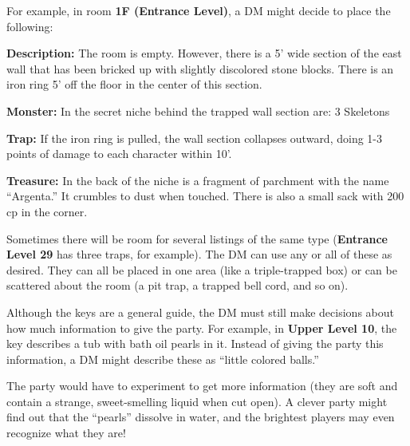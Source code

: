 \documentclass[palace_of_the_silver_princess]{subfiles}
\begin{document}
For example, in room \textbf{1F (Entrance Level)}, a DM might decide to
place the following:

\textbf{Description:} The room is empty. However, there is a 5’ wide
section of the east wall that has been bricked up with slightly
discolored stone blocks. There is an iron ring 5’ off the floor in the
center of this section.

\textbf{Monster:} In the secret niche behind the trapped wall section
are: 3 Skeletons

\textbf{Trap:} If the iron ring is pulled, the wall section collapses
outward, doing 1-3 points of damage to each character within 10’.

\textbf{Treasure:} In the back of the niche is a fragment of parchment
with the name “Argenta.” It crumbles to dust when touched. There is also
a small sack with 200 cp in the corner.

Sometimes there will be room for several listings of the same type
(\textbf{Entrance Level 29} has three traps, for example). The DM can
use any or all of these as desired. They can all be placed in one area
(like a triple-trapped box) or can be scattered about the room (a pit
trap, a trapped bell cord, and so on).

Although the keys are a general guide, the DM must still make decisions
about how much information to give the party. For example, in
\textbf{Upper Level 10}, the key describes a tub with bath oil pearls in
it. Instead of giving the party this information, a DM might describe
these as “little colored balls.”

The party would have to experiment to get more information (they are
soft and contain a strange, sweet-smelling liquid when cut open). A
clever party might find out that the “pearls” dissolve in water, and the
brightest players may even recognize what they are!
\end{document}
